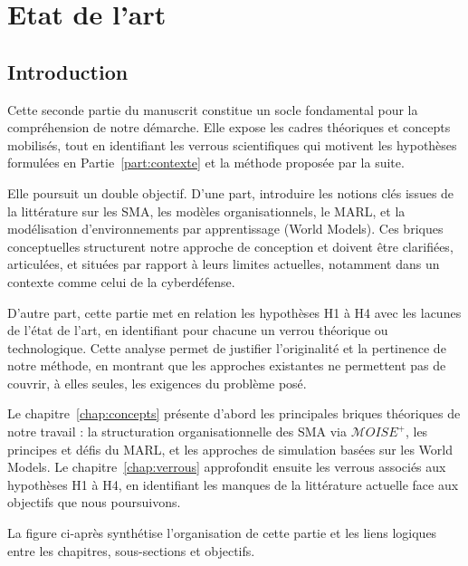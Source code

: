 \cleardoublepage
{}
\part{Etat de l'art}
\label{part:etat_art}

\chapter*{Introduction}

\noindent
Cette seconde partie du manuscrit constitue un socle fondamental pour la compréhension de notre démarche. Elle expose les cadres théoriques et concepts mobilisés, tout en identifiant les verrous scientifiques qui motivent les hypothèses formulées en Partie~\autoref{part:contexte} et la méthode proposée par la suite.

Elle poursuit un double objectif. D'une part, introduire les notions clés issues de la littérature sur les \ac{SMA}, les modèles organisationnels, le \ac{MARL}, et la modélisation d'environnements par apprentissage (World Models). Ces briques conceptuelles structurent notre approche de conception et doivent être clarifiées, articulées, et situées par rapport à leurs limites actuelles, notamment dans un contexte comme celui de la cyberdéfense.

D'autre part, cette partie met en relation les hypothèses H1 à H4 avec les lacunes de l'état de l'art, en identifiant pour chacune un verrou théorique ou technologique. Cette analyse permet de justifier l'originalité et la pertinence de notre méthode, en montrant que les approches existantes ne permettent pas de couvrir, à elles seules, les exigences du problème posé.

Le chapitre~\autoref{chap:concepts} présente d'abord les principales briques théoriques de notre travail : la structuration organisationnelle des \ac{SMA} via $\mathcal{M}OISE^+$, les principes et défis du \ac{MARL}, et les approches de simulation basées sur les World Models. Le chapitre~\autoref{chap:verrous} approfondit ensuite les verrous associés aux hypothèses H1 à H4, en identifiant les manques de la littérature actuelle face aux objectifs que nous poursuivons.

La figure ci-après synthétise l'organisation de cette partie et les liens logiques entre les chapitres, sous-sections et objectifs.


